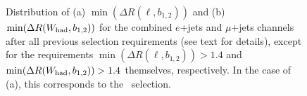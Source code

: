 \begin{figure}[htb]\begin{center}
	\caption[bla]{Distribution of (a) $\min(\Delta R(\ell, b_{1,2}))$ 
        and (b) $\min(\Delta R(\whad, b_{1,2}))$
        for the combined $e$+jets and $\mu$+jets channels after all 
        previous selection requirements (see text for details), 
        except for the requirements $\min(\Delta R(\ell, b_{1,2}))>1.4$ and
        $\min(\Delta R(\whad, b_{1,2}))>1.4$ themselves, respectively.
        In the case of (a), this corresponds to the \loose\ selection.
        }
\end{center}\end{figure}


